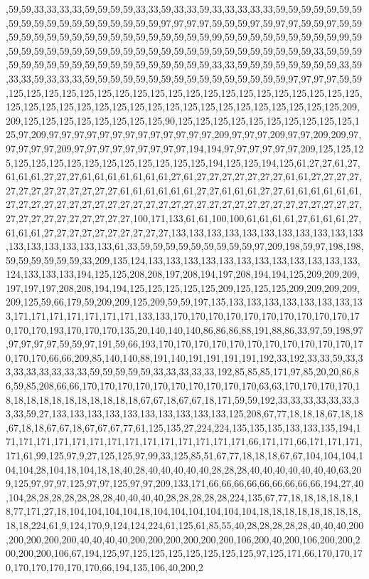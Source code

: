 ,59,59,33,33,33,33,59,59,59,59,33,33,59,33,33,59,33,33,33,33,33,59,59,59,59,59,59,59,59,59,59,59,59,59,59,59,59,59,59,59,97,97,97,97,59,59,59,97,59,97,97,59,59,97,59,59,59,59,59,59,59,59,59,59,59,59,59,59,59,59,59,59,99,59,59,59,59,59,59,59,59,59,99,59,59,59,59,59,59,59,59,59,59,59,59,59,59,59,59,59,59,59,59,59,59,59,59,59,33,59,59,59,59,59,59,59,59,59,59,59,59,59,59,59,59,59,59,59,33,33,59,59,59,59,59,59,59,59,33,59,33,33,59,33,33,33,59,59,59,59,59,59,59,59,59,59,59,59,59,59,59,59,97,97,97,97,59,59,125,125,125,125,125,125,125,125,125,125,125,125,125,125,125,125,125,125,125,125,125,125,125,125,125,125,125,125,125,125,125,125,125,125,125,125,125,125,125,209,209,125,125,125,125,125,125,125,125,90,125,125,125,125,125,125,125,125,125,125,125,97,209,97,97,97,97,97,97,97,97,97,97,97,97,97,209,97,97,97,209,97,97,209,209,97,97,97,97,97,209,97,97,97,97,97,97,97,97,97,194,194,97,97,97,97,97,97,209,125,125,125,125,125,125,125,125,125,125,125,125,125,125,194,125,125,194,125,61,27,27,61,27,61,61,61,27,27,27,61,61,61,61,61,61,61,27,61,27,27,27,27,27,27,27,61,61,27,27,27,27,27,27,27,27,27,27,27,27,27,61,61,61,61,61,61,27,27,61,61,61,27,27,61,61,61,61,61,61,27,27,27,27,27,27,27,27,27,27,27,27,27,27,27,27,27,27,27,27,27,27,27,27,27,27,27,27,27,27,27,27,27,27,27,27,27,27,100,171,133,61,61,100,100,61,61,61,61,27,61,61,61,27,61,61,61,27,27,27,27,27,27,27,27,27,27,133,133,133,133,133,133,133,133,133,133,133,133,133,133,133,133,133,61,33,59,59,59,59,59,59,59,59,59,97,209,198,59,97,198,198,59,59,59,59,59,59,33,209,135,124,133,133,133,133,133,133,133,133,133,133,133,133,124,133,133,133,194,125,125,208,208,197,208,194,197,208,194,194,125,209,209,209,197,197,197,208,208,194,194,125,125,125,125,125,209,125,125,125,209,209,209,209,209,125,59,66,179,59,209,209,125,209,59,59,197,135,133,133,133,133,133,133,133,133,171,171,171,171,171,171,171,133,133,170,170,170,170,170,170,170,170,170,170,170,170,170,193,170,170,170,135,20,140,140,140,86,86,86,88,191,88,86,33,97,59,198,97,97,97,97,97,59,59,97,191,59,66,193,170,170,170,170,170,170,170,170,170,170,170,170,170,170,66,66,209,85,140,140,88,191,140,191,191,191,191,192,33,192,33,33,59,33,33,33,33,33,33,33,33,59,59,59,59,59,33,33,33,33,33,192,85,85,85,171,97,85,20,20,86,86,59,85,208,66,66,170,170,170,170,170,170,170,170,170,170,63,63,170,170,170,170,18,18,18,18,18,18,18,18,18,18,18,67,67,18,67,67,18,171,59,59,192,33,33,33,33,33,33,33,33,59,27,133,133,133,133,133,133,133,133,133,133,125,208,67,77,18,18,18,67,18,18,67,18,18,67,67,18,67,67,67,77,61,125,135,27,224,224,135,135,135,133,133,135,194,171,171,171,171,171,171,171,171,171,171,171,171,171,171,66,171,171,66,171,171,171,171,61,99,125,97,9,27,125,125,97,99,33,125,85,51,67,77,18,18,18,67,67,104,104,104,104,104,28,104,18,104,18,18,40,28,40,40,40,40,40,28,28,28,40,40,40,40,40,40,40,63,209,125,97,97,97,125,97,97,125,97,97,209,133,171,66,66,66,66,66,66,66,66,66,194,27,40,104,28,28,28,28,28,28,28,40,40,40,40,28,28,28,28,28,224,135,67,77,18,18,18,18,18,18,77,171,27,18,104,104,104,104,18,104,104,104,104,104,104,18,18,18,18,18,18,18,18,18,18,224,61,9,124,170,9,124,124,224,61,125,61,85,55,40,28,28,28,28,28,40,40,40,200,200,200,200,200,40,40,40,40,200,200,200,200,200,200,106,200,40,200,106,200,200,200,200,200,106,67,194,125,97,125,125,125,125,125,125,125,97,125,171,66,170,170,170,170,170,170,170,170,66,194,135,106,40,200,2